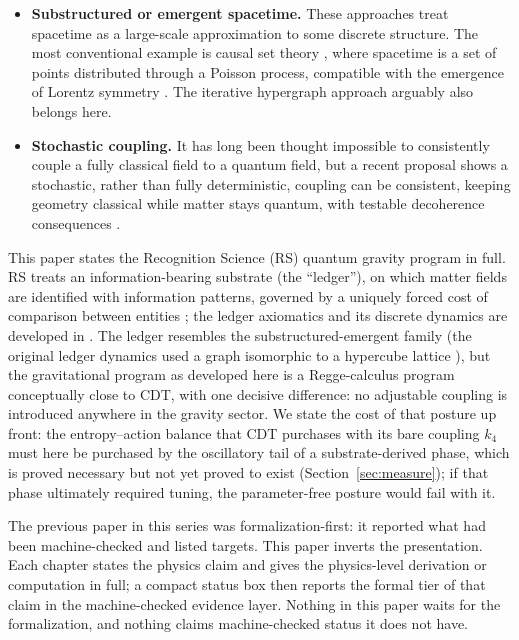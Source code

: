 \documentclass[11pt,letterpaper]{article}
\begin{document}
\begin{itemize}
\item \textbf{Substructured or emergent spacetime.} These approaches treat spacetime as a large-scale approximation to some discrete structure. The most conventional example is causal set theory \cite{CausalSets}, where spacetime is a set of points distributed through a Poisson process, compatible with the emergence of Lorentz symmetry \cite{BombelliHensonSorkin}. The iterative hypergraph approach \cite{Wolfram,Gorard} arguably also belongs here.
\item \textbf{Stochastic coupling.} It has long been thought impossible to consistently couple a fully classical field to a quantum field, but a recent proposal \cite{Oppenheim} shows a stochastic, rather than fully deterministic, coupling can be consistent, keeping geometry classical while matter stays quantum, with testable decoherence consequences \cite{OppenheimTest}.
\end{itemize}

This paper states the Recognition Science (RS) quantum gravity program in full. RS treats an information-bearing substrate (the ``ledger''), on which matter fields are identified with information patterns, governed by a uniquely forced cost of comparison between entities \cite{uniqueness,DAlembertInevitability}; the ledger axiomatics and its discrete dynamics are developed in \cite{CoherentComparisonLedger}. The ledger resembles the substructured-emergent family (the original ledger dynamics used a graph isomorphic to a hypercube lattice \cite{CoherentComparisonLedger}), but the gravitational program as developed here is a Regge-calculus program conceptually close to CDT, with one decisive difference: no adjustable coupling is introduced anywhere in the gravity sector. We state the cost of that posture up front: the entropy--action balance that CDT purchases with its bare coupling $k_{4}$ must here be purchased by the oscillatory tail of a substrate-derived phase, which is proved necessary but not yet proved to exist (Section~\ref{sec:measure}); if that phase ultimately required tuning, the parameter-free posture would fail with it.

The previous paper in this series \cite{QGrewrite} was formalization-first: it reported what had been machine-checked and listed targets. This paper inverts the presentation. Each chapter states the physics claim and gives the physics-level derivation or computation in full; a compact status box then reports the formal tier of that claim in the machine-checked evidence layer. Nothing in this paper waits for the formalization, and nothing claims machine-checked status it does not have.
\end{document}
